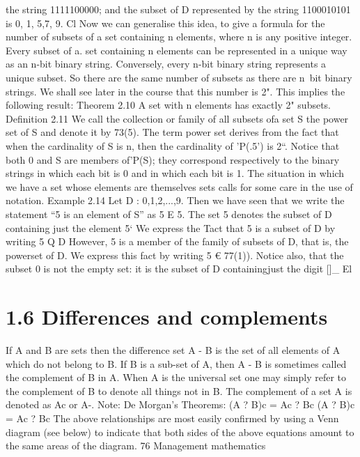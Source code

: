 {{{%
the string 1111100000; and the subset of D represented by the string 1100010101 is {0, 1, 5,7, 9}.
Cl
Now we can generalise this idea, to give a formula for the number of subsets of a set containing
n elements, where n is any positive integer. Every subset of a. set containing n elements can
be represented in a unique way as an n-bit binary string. Conversely, every n-bit binary string
represents a unique subset. So there are the same number of subsets as there are n~bit binary
strings. We shall see later in the course that this number is 2". This implies the following result:
Theorem 2.10 A set with n elements has exactly 2" subsets.
Deﬁnition 2.11 We call the collection or family of all subsets ofa set S the power set of S and
denote it by 73(5).
The term power set derives from the fact that when the cardinality of S is n, then the cardinality
of ’P(.5') is 2“. Notice that both 0 and S are members of'P(S); they correspond respectively to the
binary strings in which each bit is 0 and in which each bit is 1.
The situation in which we have a set whose elements are themselves sets calls for some care in the
use of notation.
Example 2.14 Let D : {0,1,2,...,9}. Then we have seen that we write the statement “5 is an
element of S” as
5 E 5.
The set {5} denotes the subset of D containing just the element 5‘ We express the Tact that {5}
is a subset of D by writing
{5} Q D
However, {5} is a member of the family of subsets of D, that is, the powerset of D. We express
this fact by writing
{5} € 77(1)).
Notice also, that the subset {0} is not the empty set: it is the subset of D containingjust the digit
[]_ El


\section{1.6 Differences and complements}
If A and B are sets then the difference set A - B is the set of all elements
of A which do not belong to B.
If B is a sub-set of A, then A - B is sometimes called the complement of
B in A. When A is the universal set one may simply refer to the
complement of B to denote all things not in B. The complement of a set A
is denoted as Ac or A-.
Note: De Morgan’s Theorems:
(A ? B)c = Ac ? Bc
(A ? B)c = Ac ? Bc
The above relationships are most easily confirmed by using a Venn
diagram (see below) to indicate that both sides of the above equations
amount to the same areas of the diagram.
76 Management mathematics

}}}
